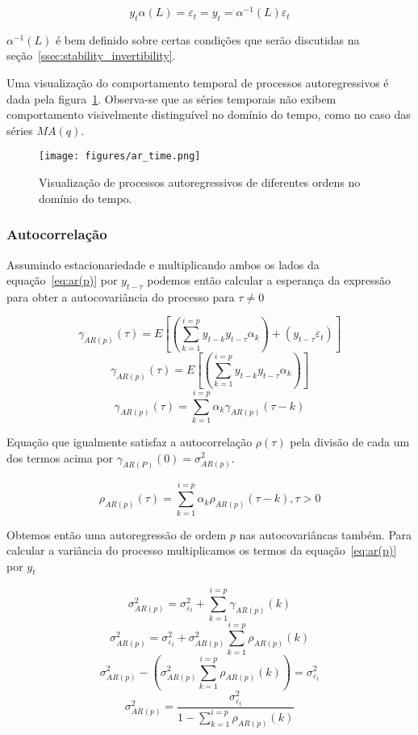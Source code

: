 $$ y_t\alpha(L) = \varepsilon_t = y_t = \alpha^{-1}(L)\varepsilon_t$$

$\alpha^{-1}(L)$ é bem definido sobre certas condições que serão discutidas na
seção~\ref{ssec:stability_invertibility}.

Uma visualização do comportamento temporal de processos autoregressivos é dada
pela figura~\ref{fig:ar_time_visualization}. Observa-se que as séries temporais
não exibem comportamento visivelmente distinguível no domínio do tempo, como
no caso das séries $MA(q)$.

\begin{figure}[H]
    \centering
    \texttt{[image: figures/ar\_time.png]}
    \caption{Visualização de processos autoregressivos de diferentes ordens
    no domínio do tempo.}
    \label{fig:ar_time_visualization}
\end{figure}

\subsubsection{Autocorrelação}

Assumindo estacionariedade e multiplicando ambos os lados da
equação~\ref{eq:ar(p)} por $y_{t-\tau}$ podemos então calcular a esperança da
expressão para obter a autocovariância do processo para $\tau \neq 0$

$$ \gamma_{AR(p)}(\tau) = E\left[\left(\sum^{i=p}_{k=1} y_{t-k}y_{t-\tau}\alpha_k\right) + (y_{t-\tau}\varepsilon_t)\right] $$
$$ \gamma_{AR(p)}(\tau) = E\left[\left(\sum^{i=p}_{k=1} y_{t-k}y_{t-\tau}\alpha_k\right)\right] $$
$$ \gamma_{AR(p)}(\tau) = \sum^{i=p}_{k=1} \alpha_k \gamma_{AR(p)}(\tau - k) $$

Equação que igualmente satisfaz a autocorrelação $\rho(\tau)$ pela divisão de
cada um dos termos acima por $\gamma_{AR(P)}(0) = \sigma_{AR(p)}^2$.

\begin{equation}\label{eq:ar_autocorr}
    \rho_{AR(p)}(\tau) = \sum^{i=p}_{k=1} \alpha_k \rho_{AR(p)}(\tau - k), \tau > 0
\end{equation}

Obtemos então uma autoregressão de ordem $p$ nas autocovariâncas também. Para
calcular a variância do processo multiplicamos os termos da equação~\ref{eq:ar(p)}
por $y_{t}$

$$ \sigma_{AR(p)}^2 = \sigma_{\varepsilon_t}^2 + \sum^{i=p}_{k=1} \gamma_{AR(p)}(k)$$
$$ \sigma_{AR(p)}^2 = \sigma_{\varepsilon_t}^2 + \sigma_{AR(p)}^2\sum^{i=p}_{k=1} \rho_{AR(p)}(k)$$
$$ \sigma_{AR(p)}^2 - \left(\sigma_{AR(p)}^2\sum^{i=p}_{k=1} \rho_{AR(p)}(k)\right) = \sigma_{\varepsilon_t}^2 $$
$$ \sigma_{AR(p)}^2 = \frac{\sigma_{\varepsilon_t}^2}{1 - \sum^{i=p}_{k=1} \rho_{AR(p)}(k)}$$

